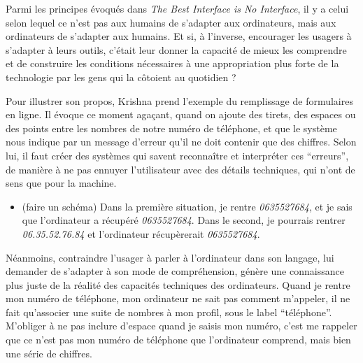 \documentclass[]{article}
\providecommand{\tightlist}{%
  \setlength{\itemsep}{0pt}\setlength{\parskip}{0pt}}
\begin{document}
Parmi les principes évoqués dans \emph{The Best Interface is No
Interface}, il y a celui selon lequel ce n'est pas aux humains de
s'adapter aux ordinateurs, mais aux ordinateurs de s'adapter aux
humains. Et si, à l'inverse, encourager les usagers à s'adapter à leurs
outils, c'était leur donner la capacité de mieux les comprendre et de
construire les conditions nécessaires à une appropriation plus forte de
la technologie par les gens qui la côtoient au quotidien ?

Pour illustrer son propos, Krishna prend l'exemple du remplissage de
formulaires en ligne. Il évoque ce moment agaçant, quand on ajoute des
tirets, des espaces ou des points entre les nombres de notre numéro de
téléphone, et que le système nous indique par un message d'erreur qu'il
ne doit contenir que des chiffres. Selon lui, il faut créer des systèmes
qui savent reconnaître et interpréter ces ``erreurs'', de manière à ne
pas ennuyer l'utilisateur avec des détails techniques, qui n'ont de sens
que pour la machine.

\begin{itemize}
\tightlist
\item
  (faire un schéma) Dans la première situation, je rentre
  \emph{0635527684}, et je sais que l'ordinateur a récupéré
  \emph{0635527684}. Dans le second, je pourrais rentrer
  \emph{06.35.52.76.84} et l'ordinateur récupèrerait \emph{0635527684}.
\end{itemize}

Néanmoins, contraindre l'usager à parler à l'ordinateur dans son
langage, lui demander de s'adapter à son mode de compréhension, génère
une connaissance plus juste de la réalité des capacités techniques des
ordinateurs. Quand je rentre mon numéro de téléphone, mon ordinateur ne
sait pas comment m'appeler, il ne fait qu'associer une suite de nombres
à mon profil, sous le label ``téléphone''. M'obliger à ne pas inclure
d'espace quand je saisis mon numéro, c'est me rappeler que ce n'est pas
mon numéro de téléphone que l'ordinateur comprend, mais bien une série
de chiffres.
\end{document}
